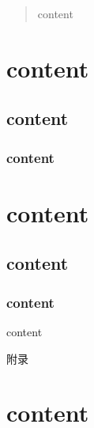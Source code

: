 \documentclass{MathorCupmodeling}
\begin{document}
	\begin{abstract}
		content
	\end{abstract}
	\tableofcontents\newpage
	\section{content}
	\subsection{content}
	\subsubsection{content}
	\section{content}
	\subsection{content}
	\subsubsection{content}

	\begin{thebibliography}{99}
	content
	\end{thebibliography}

	\newpage
	\appendix	
	\begin{center}
		\heiti{} 附\hspace{1pc}录
	\end{center}
	\section{content}
\end{document}
